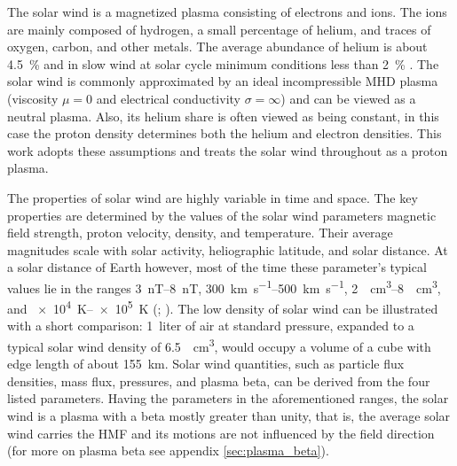 The solar wind is a magnetized plasma consisting of electrons and ions. The ions are mainly composed of hydrogen, a small percentage of helium, and traces of oxygen, carbon, and other metals. The average abundance of helium is about \SI{4.5}{\%} and in slow wind at solar cycle minimum conditions less than \SI{2}{\%} \citep{Feldman1978,Schwenn1983,Kasper2012}.
The solar wind is commonly approximated by an ideal incompressible MHD plasma (viscosity $\mu = 0$ and electrical conductivity $\sigma = \infty$) and can be viewed as a neutral plasma. Also, its helium share is often viewed as being constant, in this case the proton density determines both the helium and electron densities. This work adopts these assumptions and treats the solar wind throughout as a proton plasma.

The properties of solar wind are highly variable in time and space. The key properties are determined by the values of the solar wind parameters magnetic field strength, proton velocity, density, and temperature. Their average magnitudes scale with solar activity, heliographic latitude, and solar distance. At a solar distance of Earth however, most of the time these parameter's typical values lie in the ranges \SIrange{3}{8}{\nano\tesla}, \SIrange{300}{500}{\km\per\s}, \SIrange{2}{8}{\per\cm\cubed}, and \SIrange{e4}{e5}{\K} (\citealp[p.~92]{Kivelson1995}; \citealt{Venzmer2018}). The low density of solar wind can be illustrated with a short comparison: 1~liter of air at standard pressure, expanded to a typical solar wind density of \SI{6.5}{\per\cm\cubed}, would occupy a volume of a cube with edge length of about \SI{155}{\km}.
Solar wind quantities, such as particle flux densities, mass flux, pressures, and plasma beta, can be derived from the four listed parameters. Having the parameters in the aforementioned ranges, the solar wind is a plasma with a beta mostly greater than unity, that is, the average solar wind carries the HMF and its motions are not influenced by the field direction (for more on plasma beta see appendix \autoref{sec:plasma_beta}).

